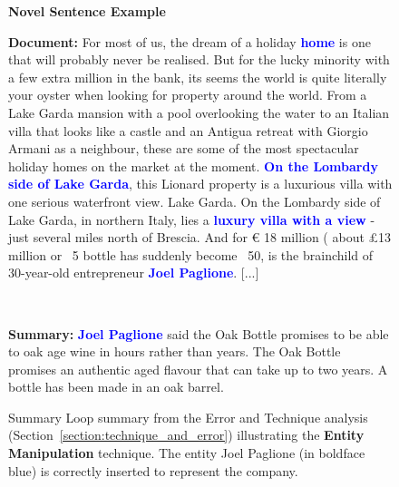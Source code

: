 \documentclass[11pt,a4paper]{article}
\begin{document}
\begin{figure*}[!htbp]
    \begin{framed}
        \begin{center}
            \large
            \textbf{Novel Sentence Example}
        \end{center}

        \textbf{Document:}
        For most of us, the dream of a holiday \textbf{\textcolor{blue}{home}} is one that will probably never be realised. But for the lucky minority with a few extra million in the bank, its seems the world is quite literally your oyster when looking for property around the world. From a Lake Garda mansion with a pool overlooking the water to an Italian villa that looks like a castle and an Antigua retreat with Giorgio Armani as a neighbour, these are some of the most spectacular holiday homes on the market at the moment. \textbf{\textcolor{blue}{On the Lombardy side of Lake Garda}}, this Lionard property is a luxurious villa with one serious waterfront view. Lake Garda. On the Lombardy side of Lake Garda, in northern Italy, lies a \textbf{\textcolor{blue}{luxury villa with a view}} - just several miles north of Brescia. And for \euro{} 18 million ( about \pounds 13 million or \ 5 bottle has suddenly become \ 50, is the brainchild of 30-year-old entrepreneur \textbf{\textcolor{blue}{Joel Paglione}}. [...]
         \begin{center}
            ~
        \end{center}
        \textbf{Summary:} \textbf{\textcolor{blue}{Joel Paglione}} said the Oak Bottle promises to be able to oak age wine in hours rather than years. The Oak Bottle promises an authentic aged flavour that can take up to two years. A bottle has been made in an oak barrel.
        
    \end{framed}

    \caption{Summary Loop summary from the Error and Technique analysis (Section~\ref{section:technique_and_error}) illustrating the \textbf{Entity Manipulation} technique. The entity Joel Paglione (in boldface blue) is correctly inserted to represent the company.}
    \label{fig:extra_examples4}
\end{figure*}
\end{document}
